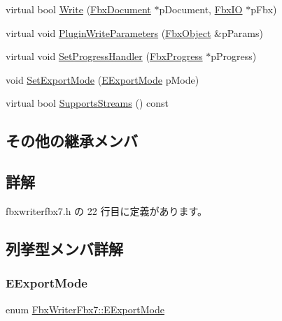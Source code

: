 \begin{DoxyCompactItemize}
virtual bool \hyperlink{class_fbx_writer_fbx7_a4e20df937a566f3b5eb68427808354f9}{Write} (\hyperlink{class_fbx_document}{Fbx\+Document} $\ast$p\+Document, \hyperlink{class_fbx_i_o}{Fbx\+IO} $\ast$p\+Fbx)
\item 
virtual void \hyperlink{class_fbx_writer_fbx7_a36f757ea224bdb66cf732cb9a5a534f2}{Plugin\+Write\+Parameters} (\hyperlink{class_fbx_object}{Fbx\+Object} \&p\+Params)
\item 
virtual void \hyperlink{class_fbx_writer_fbx7_a80285d709aabb9d36f3f10d95cebf356}{Set\+Progress\+Handler} (\hyperlink{class_fbx_progress}{Fbx\+Progress} $\ast$p\+Progress)
\item 
void \hyperlink{class_fbx_writer_fbx7_aaa8b395c07a3ded65291060522d06848}{Set\+Export\+Mode} (\hyperlink{class_fbx_writer_fbx7_a07b7bcbb11c9befcbd0eacd265458005}{E\+Export\+Mode} p\+Mode)
\item 
virtual bool \hyperlink{class_fbx_writer_fbx7_a1db3d07967773f3b1af23d15757c281a}{Supports\+Streams} () const
\end{DoxyCompactItemize}
\subsection*{その他の継承メンバ}


\subsection{詳解}


 fbxwriterfbx7.\+h の 22 行目に定義があります。



\subsection{列挙型メンバ詳解}
\mbox{\label{class_fbx_writer_fbx7_a07b7bcbb11c9befcbd0eacd265458005}} 
\subsubsection{\texorpdfstring{E\+Export\+Mode}{EExportMode}}
{\footnotesize\ttfamily enum \hyperlink{class_fbx_writer_fbx7_a07b7bcbb11c9befcbd0eacd265458005}{Fbx\+Writer\+Fbx7\+::\+E\+Export\+Mode}}

